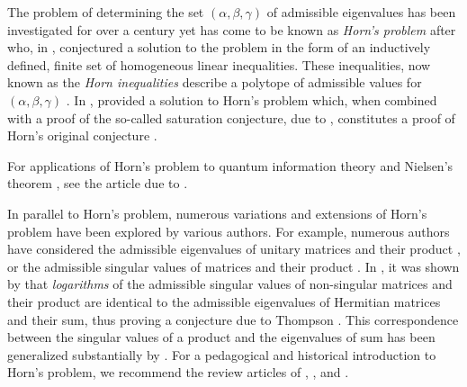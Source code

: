 \documentclass[notitlepage, 10pt]{article}
\begin{document}
The problem of determining the set $(\alpha,\beta,\gamma)$ of admissible eigenvalues has been investigated for over a century yet has come to be known as \textit{Horn's problem} after \citeauthor{horn1962eigenvalues} who, in \citeyear{horn1962eigenvalues}, conjectured a solution to the problem in the form of an inductively defined, finite set of homogeneous linear inequalities.
These inequalities, now known as the \textit{Horn inequalities} describe a polytope of admissible values for $(\alpha,\beta,\gamma)$ \cite{horn1962eigenvalues}.
In \citeyear{klyachko1998stable}, \citeauthor{klyachko1998stable} provided a solution to Horn's problem \cite{klyachko1998stable} which, when combined with a proof of the so-called saturation conjecture, due to \citeauthor{knutson1999honeycomb} \cite{knutson1999honeycomb}, constitutes a proof of Horn's original conjecture \cite{fulton1998eigenvalues}.

For applications of Horn's problem to quantum information theory and Nielsen's theorem \cite{nielsen1999conditions}, see the article due to \citeauthor{daftuar2005quantum} \cite{daftuar2005quantum}.

In parallel to Horn's problem, numerous variations and extensions of Horn's problem have been explored by various authors.
For example, numerous authors have considered the admissible eigenvalues of unitary matrices and their product \cite{agnihotri1997eigenvalues,belkale2008quantum,belkale2016multiplicative}, or the admissible singular values of matrices and their product \cite{speyer2005horn,thompson1971eigenvaluesviii}.
In \citeyear{klyachko2000random}, it was shown by \cite{klyachko2000random} that \textit{logarithms} of the admissible singular values of non-singular matrices and their product are identical to the admissible eigenvalues of Hermitian matrices and their sum, thus proving a conjecture due to Thompson \cite{klyachko2000random}.
This correspondence between the singular values of a product and the eigenvalues of sum has been generalized substantially by \citeauthor{alekseev2001linearization} \cite{alekseev2001linearization}.
For a pedagogical and historical introduction to Horn's problem, we recommend the review articles of \citeauthor{bhatia2001linear} \cite{bhatia2001linear}, \citeauthor{knutson2000symplectic} \cite{knutson2000symplectic}, and \citeauthor{fulton2000eigenvalues} \cite{fulton2000eigenvalues}.
\end{document}
